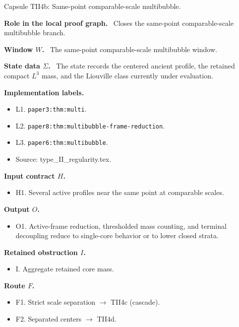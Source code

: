 \documentclass[11pt]{amsart}
\newcommand{\capsulefield}[1]{\par\smallskip\noindent\textbf{#1.}\ }
\begin{document}
\begin{proofcapsule}{Capsule TII4b: Same-point comparable-scale multibubble.}
  \capsulefield{Role in the local proof graph}
  Closes the same-point comparable-scale multibubble branch.

  \capsulefield{Window \(W\)}
The same-point comparable-scale multibubble window.

  \capsulefield{State data \(\Sigma\)}
The state records the centered ancient profile, the retained compact $L^3$ mass, and the Liouville class currently under evaluation.

  \capsulefield{Implementation labels}
  \begin{itemize}[leftmargin=1.8em]
  \item L1. \texttt{paper3:thm:multi}.
  \item L2. \texttt{paper8:thm:multibubble-frame-reduction}.
  \item L3. \texttt{paper6:thm:multibubble}.
  \item Source: type\_II\_regularity.tex.
  \end{itemize}

  \capsulefield{Input contract \(H\)}
  \begin{itemize}[leftmargin=1.8em]
  \item H1. Several active profiles near the same point at comparable scales.
  \end{itemize}

  \capsulefield{Output \(O\)}
  \begin{itemize}[leftmargin=1.8em]
  \item O1. Active-frame reduction, thresholded mass counting, and terminal decoupling reduce to single-core behavior or to lower closed strata.
  \end{itemize}

  \capsulefield{Retained obstruction \(I\)}
  \begin{itemize}[leftmargin=1.8em]
  \item I. Aggregate retained core mass.
  \end{itemize}

  \capsulefield{Route \(F\)}
  \begin{itemize}[leftmargin=1.8em]
  \item F1. Strict scale separation $\to$ TII4c (cascade).
  \item F2. Separated centers $\to$ TII4d.
  \end{itemize}


\end{proofcapsule}
\end{document}
